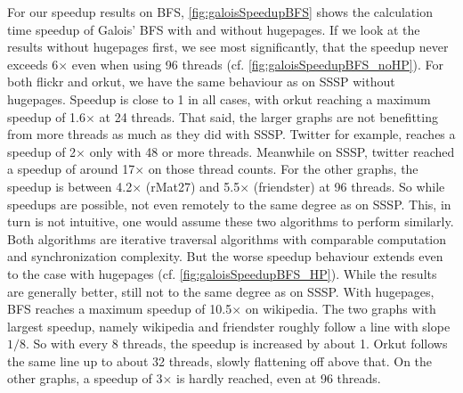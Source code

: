 For our speedup results on BFS, \autoref{fig:galoisSpeedupBFS} shows the calculation time speedup of Galois' BFS with and without hugepages.
If we look at the results without hugepages first, we see most significantly, that the speedup never exceeds 6$\times$ even when using 96 threads (cf. \autoref{fig:galoisSpeedupBFS_noHP}).
For both flickr and orkut, we have the same behaviour as on SSSP without hugepages. Speedup is close to 1 in all cases, with orkut reaching a maximum speedup of 1.6$\times$ at 24 threads.
That said, the larger graphs are not benefitting from more threads as much as they did with SSSP. Twitter for example, reaches a speedup of 2$\times$ only with 48 or more threads. Meanwhile on SSSP, twitter reached a speedup of around 17$\times$ on those thread counts.
For the other graphs, the speedup is between 4.2$\times$ (rMat27) and 5.5$\times$ (friendster) at 96 threads. So while speedups are possible, not even remotely to the same degree as on SSSP. This, in turn is not intuitive, one would assume these two algorithms to perform similarly. Both algorithms are iterative traversal algorithms with comparable computation and synchronization complexity. But the worse speedup behaviour extends even to the case with hugepages (cf. \autoref{fig:galoisSpeedupBFS_HP}). While the results are generally better, still not to the same degree as on SSSP. With hugepages, BFS reaches a maximum speedup of 10.5$\times$ on wikipedia. The two graphs with largest speedup, namely wikipedia and friendster roughly follow a line with slope $1/8$. So with every 8 threads, the speedup is increased by about 1. Orkut follows the same line up to about 32 threads, slowly flattening off above that.
On the other graphs, a speedup of 3$\times$ is hardly reached, even at 96 threads.

